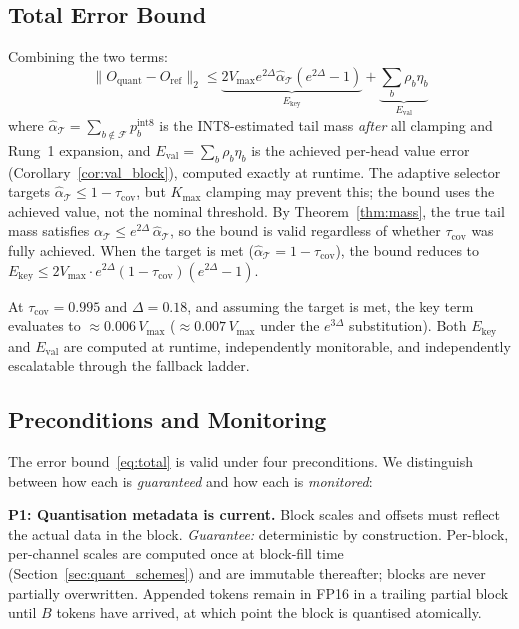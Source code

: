 \documentclass[10pt,twocolumn,a4paper]{article}
\theoremstyle{definition}
\theoremstyle{remark}
\newcommand{\norm}[1]{\lVert #1 \rVert}
\begin{document}
\subsection{Total Error Bound}

Combining the two terms:
\begin{equation}
\label{eq:total}
  \norm{O_{\mathrm{quant}} \!-\! O_{\mathrm{ref}}}_2
  \leq \underbrace{2 V_{\max} e^{2\Delta}\hat{\alpha}_{\mathcal{T}}(e^{2\Delta} \!-\! 1)}_{E_{\mathrm{key}}}
  + \underbrace{\textstyle\sum_b \rho_b\eta_b}_{E_{\mathrm{val}}}
\end{equation}
where $\hat{\alpha}_{\mathcal{T}} = \sum_{b \notin \mathcal{F}} p_b^{\mathrm{int8}}$ is the INT8-estimated tail mass \emph{after} all clamping and Rung~1 expansion, and $E_{\mathrm{val}} = \sum_b \rho_b \eta_b$ is the achieved per-head value error (Corollary~\ref{cor:val_block}), computed exactly at runtime.  The adaptive selector targets $\hat{\alpha}_{\mathcal{T}} \leq 1 - \tau_{\mathrm{cov}}$, but $K_{\max}$ clamping may prevent this; the bound uses the achieved value, not the nominal threshold.  By Theorem~\ref{thm:mass}, the true tail mass satisfies $\alpha_{\mathcal{T}} \leq e^{2\Delta}\,\hat{\alpha}_{\mathcal{T}}$, so the bound is valid regardless of whether $\tau_{\mathrm{cov}}$ was fully achieved.  When the target is met ($\hat{\alpha}_{\mathcal{T}} = 1 - \tau_{\mathrm{cov}}$), the bound reduces to $E_{\mathrm{key}} \leq 2V_{\max} \cdot e^{2\Delta}(1 - \tau_{\mathrm{cov}})(e^{2\Delta} - 1)$.

At $\tau_{\mathrm{cov}} = 0.995$ and $\Delta = 0.18$, and assuming the target is met, the key term evaluates to $\approx 0.006\,V_{\max}$ ($\approx 0.007\,V_{\max}$ under the $e^{3\Delta}$ substitution).  Both $E_{\mathrm{key}}$ and $E_{\mathrm{val}}$ are computed at runtime, independently monitorable, and independently escalatable through the fallback ladder.

\subsection{Preconditions and Monitoring}
\label{sec:preconditions}

The error bound~\eqref{eq:total} is valid under four preconditions.  We distinguish between how each is \emph{guaranteed} and how each is \emph{monitored}:

\textbf{P1: Quantisation metadata is current.}  Block scales and offsets must reflect the actual data in the block.  \emph{Guarantee:} deterministic by construction.  Per-block, per-channel scales are computed once at block-fill time (Section~\ref{sec:quant_schemes}) and are immutable thereafter; blocks are never partially overwritten.  Appended tokens remain in FP16 in a trailing partial block until $B$ tokens have arrived, at which point the block is quantised atomically.
\end{document}
